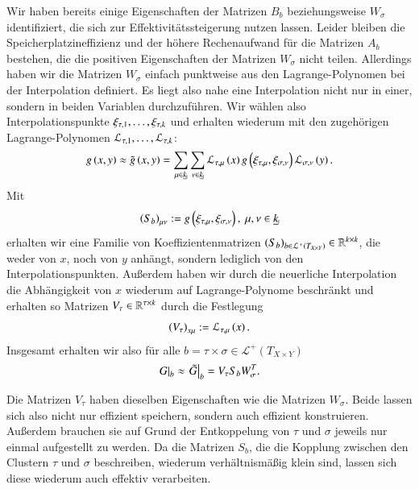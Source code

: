     Wir haben bereits einige Eigenschaften der Matrizen $B_b$ beziehungsweise $W_\sigma$ identifiziert, die sich zur Effektivitätssteigerung nutzen lassen.
    Leider bleiben die Speicherplatzineffizienz und der höhere Rechenaufwand für die Matrizen $A_b$ bestehen, die die positiven Eigenschaften der Matrizen $W_\sigma$ nicht teilen. Allerdings 
    haben wir die Matrizen $W_\sigma$ einfach punktweise aus den Lagrange-Polynomen bei der Interpolation definiert. Es liegt also nahe eine Interpolation nicht nur in einer, sondern in beiden 
    Variablen durchzuführen. Wir wählen also Interpolationspunkte $\xi_{\tau, 1}, \dots , \xi_{\tau, k}$ und erhalten wiederum mit den zugehörigen Lagrange-Polynomen 
    $\mathcal{L}_{\tau, 1}, \dots, \mathcal{L}_{\tau, k}$:
    \begin{equation*}
      g\left(x,y\right) \approx \tilde g\left(x,y\right) = \sum_{\mu \in \haken{k}} \sum_{\nu \in \haken{k}} \lag_\indt{\mu}\left(x\right) g\left(\xi_\indt{\mu}, \xi_\inds{\nu}\right) \lag_\inds{\nu}\left(y\right).
    \end{equation*}
    Mit 
    \begin{equation*}
      \left(S_b\right)_{\mu\nu} := g\left(\xi_\indt{\mu}, \xi_\inds{\nu}\right), \ \mu,\nu \in \haken{k}
    \end{equation*}
    erhalten wir eine Familie von Koeffizientenmatrizen $\left(S_b\right)_{b \in \mathcal{L}^+\left(T_{X \times Y}\right)} \in \mathbb{R}^{k \times k}$, die weder von $x$, noch von $y$ anhängt, sondern lediglich von den 
    Interpolationspunkten.
    Außerdem haben wir durch die neuerliche Interpolation die Abhängigkeit von $x$ wiederum auf Lagrange-Polynome beschränkt und erhalten so Matrizen $V_\tau \in \mathbb{R}^{\tau \times k}$ durch
    die Festlegung
    \begin{equation*}
      \left(V_\tau\right)_{x\mu} := \mathcal{L}_{\tau, \mu}\left(x\right).
    \end{equation*}
    Insgesamt erhalten wir also für alle $b = \tau \times \sigma \in \mathcal{L}^+\left(T_{X \times Y}\right)$
    \begin{equation*}
      \left. G \right|_b \approx \left. \tilde G \right|_b = V_\tau S_b W_\sigma^T.
    \end{equation*}
    
    Die Matrizen $V_\tau$ haben dieselben Eigenschaften wie die Matrizen $W_\sigma$. Beide lassen sich also nicht nur effizient speichern, sondern auch effizient konstruieren. Außerdem 
    brauchen sie auf Grund der Entkoppelung von $\tau$ und $\sigma$ jeweils nur einmal aufgestellt zu werden. Da die Matrizen $S_b$, die die Kopplung zwischen den Clustern 
    $\tau$ und $\sigma$ beschreiben, wiederum verhältnismäßig klein sind, lassen sich diese wiederum auch effektiv verarbeiten.
    
